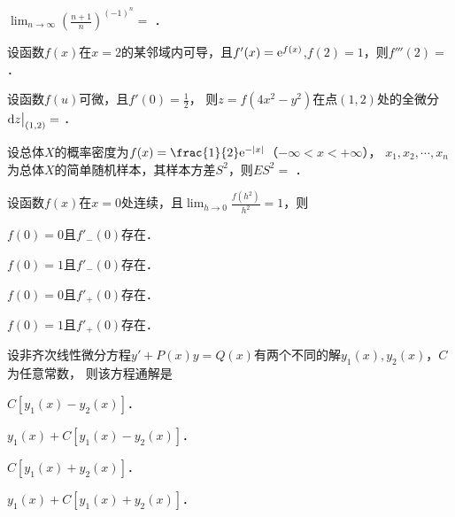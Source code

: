 \documentclass[plain,noanswer,medmath]{../../template/jnuexam}
\begin{document}






\begin{problem}
$\lim_{n \to \infty} \left(\frac{n + 1}{n} \right)^{(- 1)^n} =$ \fillin{}．
\end{problem}


\begin{problem}
设函数$f(x)$在$x = 2$的某邻域内可导，且$f'(x) = \mathrm{e}^{f(x)}$,$f(2) = 1$，则$f'''(2) =$ \fillin{}．
\end{problem}


\begin{problem}
设函数$f(u)$可微，且$f'(0) = \frac{1}{2}$，
则$z = f\left(4x^2 - y^2 \right)$在点$(1,2)$处的全微分$\mathop{}\!\mathrm{d} z\big|_{\left(1,2 \right)} =$ \fillin{}．
\end{problem}






\begin{problem}
设总体$X$的概率密度为$f(x) = \frac{1}{2}\e^{- |x|}$（$-\infty < x < +\infty$），
$x_1,x_2, \cdots ,x_n$为总体$X$的简单随机样本，其样本方差$S^2$，则$ES^2 =$ \fillin{}．
\end{problem}






\begin{problem}
设函数$f(x)$在$x = 0$处连续，且$\lim_{h \to 0}\frac{f\left(h^2\right)}{h^2} = 1$，则\pickout{}
\begin{abcd}
\item $f(0) = 0$且$f'_-(0)$存在．
\item $f(0) = 1$且$f'_-(0)$存在．
\item $f(0) = 0$且$f'_+(0)$存在．
\item $f(0) = 1$且$f'_+(0)$存在．
\end{abcd}
\end{problem}




\begin{problem}
设非齐次线性微分方程$y' + P(x)y = Q(x)$有两个不同的解$y_1(x),y_2(x)$，$C$为任意常数，
则该方程通解是\pickout{}
\begin{abcd}
\item $C\left[y_1(x) - y_2(x) \right]$．
\item $y_1(x) + C\left[y_1(x) - y_2(x) \right]$．
\item $C\left[y_1(x) + y_2(x) \right]$．
\item $y_1(x) + C\left[y_1(x) + y_2(x) \right]$．
\end{abcd}
\end{problem}
\end{document}
